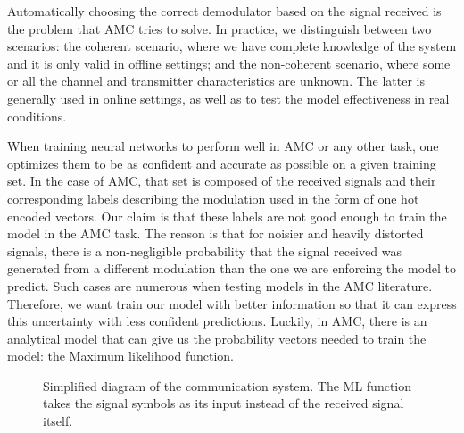 \documentclass[conference]{IEEEtran}
\begin{document}
Automatically choosing the correct demodulator based on the signal received is the problem that AMC tries to solve. 
In practice, we distinguish between two scenarios: the coherent scenario, where we have complete knowledge of the system and it is only valid in offline settings; and the non-coherent scenario, where some or all the channel and transmitter characteristics are unknown. The latter is generally used in online settings, as well as to test the model effectiveness in real conditions.

When training neural networks to perform well in AMC or any other task, one optimizes them to be as confident and accurate as possible on a given training set. In the case of AMC, that set is composed of the received signals and their corresponding labels describing the modulation used in the form of one hot encoded vectors. Our claim is that these labels are not good enough to train the model in the AMC task. The reason is that for noisier and heavily distorted signals, there is a non-negligible probability that the signal received was generated from a different modulation than the one we are enforcing the model to predict. Such cases are numerous when testing models in the AMC literature. Therefore, we want train our model with better information so that it can express this uncertainty with less confident predictions. Luckily, in AMC, there is an analytical model that can give us the probability vectors needed to train the model: the Maximum likelihood function. 


\begin{figure}
\caption{Simplified diagram of the communication system. The ML function takes the signal symbols as its input instead of the received signal itself.}
\label{fig:comm_system}
\end{figure}
\end{document}
